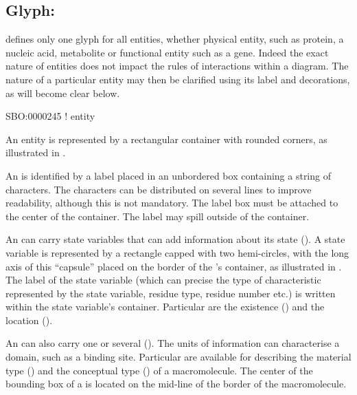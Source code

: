 \color{green}

\subsection{Glyph: }
\label{sec:entity}

\SBGNERLone defines only one glyph for all entities, whether physical entity, such as protein, a nucleic acid, metabolite or functional entity such as a gene. Indeed the exact nature of entities does not impact the rules of interactions within a diagram. The nature of a particular entity may then be clarified using its label and decorations, as will become clear below. 

\begin{glyphDescription}

\glyphSboTerm SBO:0000245 ! entity 

\glyphContainer An entity is represented by a rectangular container with rounded corners, as illustrated in .

\glyphLabel An  is identified by a label placed in an unbordered box containing a string of characters.  The characters can be distributed on several lines to improve readability, although this is not mandatory.  The label box must be attached to the center of the container.  The label may spill outside of the container.

\glyphAux An  can carry state variables that can add information about its state ().  A state variable is represented by a rectangle capped with two hemi-circles, with the long axis of this  ``capsule'' placed on the border of the 's container, as illustrated in .  The label of the state variable (which can precise the type of characteristic represented by the state variable, residue type, residue number etc.) is written within the state variable's container. Particular  are the existence () and the location ().

An  can also carry one or several  ().  The units of information can characterise a domain, such as a binding site.  Particular  are available for describing the material type () and the conceptual type () of a macromolecule.  The center of the bounding box of a  is located on the mid-line of the border of the macromolecule.

\end{glyphDescription}

